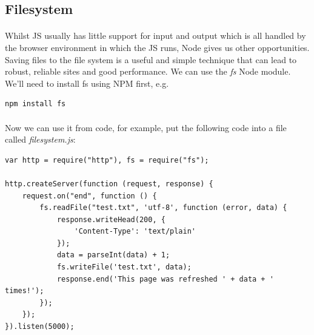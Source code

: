 \documentclass[10pt, a4paper, twosize]{article}
\begin{document}

\subsection{Filesystem}
\paragraph{} Whilst JS usually has little support for input and output which is all handled by the browser environment in which the JS runs, Node gives us other opportunities. Saving files to the file system is a useful and simple technique that can lead to robust, reliable sites and good performance. We can use the \emph{fs} Node module. We'll need to install fs using NPM first, e.g.

\begin{lstlisting}[style=DOS]
    npm install fs
\end{lstlisting}

\paragraph{} Now we can use it from code, for example, put the following code into a file called \emph{filesystem.js}:

\begin{lstlisting}
var http = require("http"),	fs = require("fs");

http.createServer(function (request, response) {
	request.on("end", function () {
		fs.readFile("test.txt", 'utf-8', function (error, data) {
			response.writeHead(200, {
				'Content-Type': 'text/plain'
			});
			data = parseInt(data) + 1;
			fs.writeFile('test.txt', data);
			response.end('This page was refreshed ' + data + ' times!');
		});
	});
}).listen(5000);
\end{lstlisting}
\end{document}

